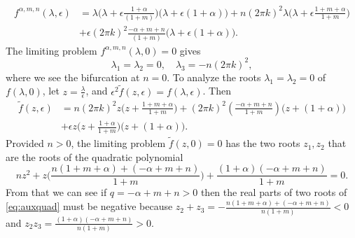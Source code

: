\documentclass[a4paper,11pt]{article}
\theoremstyle{remark}
\begin{document}
\begin{align}
f^{\alpha,m,n}(\lambda,\epsilon)&= \lambda\Big(\lambda + \epsilon\frac{1+\alpha}{(1+m)}\Big)\Big(\lambda + \epsilon(1+\alpha)\Big) + n(2\pi k)^2\lambda\Big(\lambda + \epsilon\frac{1+m+\alpha}{1+m}\Big) \nonumber \\
&+ \epsilon(2\pi k)^2\frac{-\alpha+m+n}{(1+m)}\Big(\lambda + \epsilon(1+\alpha)\Big).
\end{align}
The limiting problem $f^{\alpha,m,n}(\lambda,0)=0$ gives 
$$ \lambda_1=\lambda_2=0, \quad \lambda_3 = -n(2\pi k)^2,$$
where we see the bifurcation at $n=0$. To analyze the roots $\lambda_1=\lambda_2=0$  of $f(\lambda,0)$, let $z = \frac{\lambda}{\epsilon}$, and $\epsilon^2\tilde{f}(z,\epsilon) =  f(\lambda, \epsilon)$. Then
\begin{align}
 \tilde{f}(z,\epsilon) &= n(2\pi k)^2 z\Big(z + \frac{1+m+\alpha}{1+m}\Big)+ (2\pi k)^2\left(\frac{-\alpha+m+n}{1+m}\right)\Big(z + (1+\alpha)\Big) \nonumber\\
 &+ \epsilon z\Big(z+\frac{1+\alpha}{1+m}\Big)\Big(z+(1+\alpha)\Big). \label{eq:reduced_poly}
\end{align}
Provided $n>0$, the limiting problem $\tilde{f}(z,0)=0$ has the two roots $z_1,z_2$ that are the roots of the quadratic polynomial
\begin{equation} 
nz^2 + z\Big( \frac{n(1+m+\alpha) + (-\alpha+m+n)}{1+m}\Big) + \frac{(1+\alpha)(-\alpha+m+n)}{1+m} =0. \label{eq:auxquad} 
\end{equation}
From that we can see if $q=-\alpha+m+n>0$ then the real parts of two roots of \eqref{eq:auxquad} must be negative because $z_2+z_3 = -\frac{n(1+m+\alpha) + (-\alpha+m+n)}{n(1+m)} < 0$ and $z_2z_3=\frac{(1+\alpha)(-\alpha+m+n)}{n(1+m)}>0$.%
\end{document}
